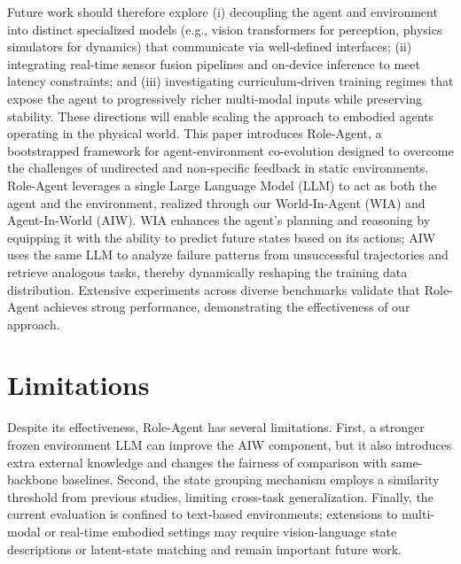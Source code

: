 \documentclass{llmxive}
\begin{document}
Future work should therefore explore (i) decoupling the agent and environment into distinct specialized models (e.g., vision transformers for perception, physics simulators for dynamics) that communicate via well‑defined interfaces; (ii) integrating real‑time sensor fusion pipelines and on‑device inference to meet latency constraints; and (iii) investigating curriculum‑driven training regimes that expose the agent to progressively richer multi‑modal inputs while preserving stability. These directions will enable scaling the approach to embodied agents operating in the physical world.
This paper introduces Role-Agent, a bootstrapped framework for agent-environment co-evolution designed to overcome the challenges of undirected and non-specific feedback in static environments. Role-Agent leverages a single Large Language Model (LLM) to act as both the agent and the environment, realized through our World-In-Agent (WIA) and Agent-In-World (AIW). WIA enhances the agent's planning and reasoning by equipping it with the ability to predict future states based on its actions; AIW uses the same LLM to analyze failure patterns from unsuccessful trajectories and retrieve analogous tasks, thereby dynamically reshaping the training data distribution. Extensive experiments across diverse benchmarks validate that Role-Agent achieves strong performance, demonstrating the effectiveness of our approach.


\section*{Limitations}
Despite its effectiveness, Role-Agent has several limitations. First, a stronger frozen environment LLM can improve the AIW component, but it also introduces extra external knowledge and changes the fairness of comparison with same-backbone baselines. Second, the state grouping mechanism employs a similarity threshold from previous studies, limiting cross-task generalization.  Finally, the current evaluation is confined to text-based environments; extensions to multi-modal or real-time embodied settings may require vision-language state descriptions or latent-state matching and remain important future work.
 



%



\end{document}
